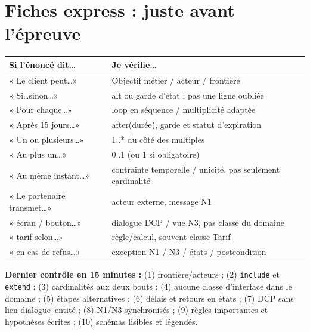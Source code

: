 \documentclass[10pt,a4paper]{article}
\begin{document}
\section{Fiches express : juste avant l'épreuve}
\begin{tabularx}{\linewidth}{@{}p{35mm}X@{}}
\toprule
Si l'énoncé dit\ldots & Je vérifie\ldots \\
\midrule
« Le client peut\ldots » & Objectif métier / acteur / frontière \\
« Si\ldots sinon\ldots » & alt ou garde d'état ; pas une ligne oubliée \\
« Pour chaque\ldots » & loop en séquence / multiplicité adaptée \\
« Après 15 jours\ldots » & after(durée), garde et statut d'expiration \\
« Un ou plusieurs\ldots » & 1..* du côté des multiples \\
« Au plus un\ldots » & 0..1 (ou 1 si obligatoire) \\
« Au même instant\ldots » & contrainte temporelle / unicité, pas seulement cardinalité \\
« Le partenaire transmet\ldots » & acteur externe, message N1 \\
« écran / bouton\ldots » & dialogue DCP / vue N3, pas classe du domaine \\
« tarif selon\ldots » & règle/calcul, souvent classe Tarif \\
« en cas de refus\ldots » & exception N1 / N3 / états / postcondition \\
\bottomrule
\end{tabularx}

\begin{memo}
\textbf{Dernier contrôle en 15 minutes :} (1) frontière/acteurs ; (2) \texttt{include} et \texttt{extend} ; (3) cardinalités aux deux bouts ; (4) aucune classe d'interface dans le domaine ; (5) étapes alternatives ; (6) délais et retours en états ; (7) DCP sans lien dialogue--entité ; (8) N1/N3 synchronisés ; (9) règles importantes et hypothèses écrites ; (10) schémas lisibles et légendés.
\end{memo}
\end{document}
